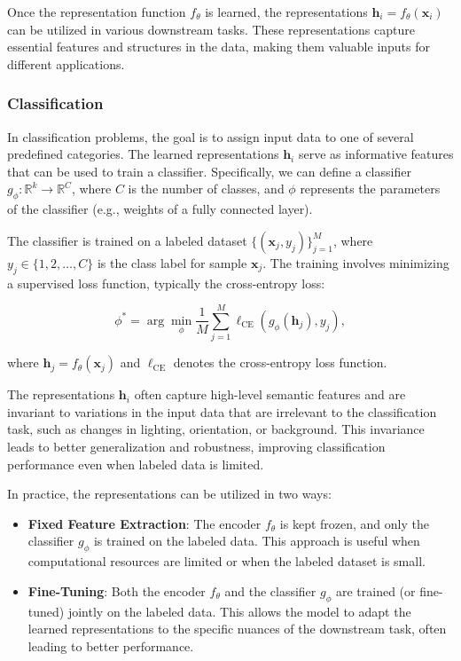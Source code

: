 \begin{itemize}
Once the representation function \( f_{\theta} \) is learned, the representations \( \mathbf{h}_i = f_{\theta}(\mathbf{x}_i) \) can be utilized in various downstream tasks. These representations capture essential features and structures in the data, making them valuable inputs for different applications.

\subsubsection{Classification}

In classification problems, the goal is to assign input data to one of several predefined categories. The learned representations \( \mathbf{h}_i \) serve as informative features that can be used to train a classifier. Specifically, we can define a classifier \( g_{\phi} : \mathbb{R}^k \rightarrow \mathbb{R}^C \), where \( C \) is the number of classes, and \( \phi \) represents the parameters of the classifier (e.g., weights of a fully connected layer).

The classifier is trained on a labeled dataset \( \{ (\mathbf{x}_j, y_j) \}_{j=1}^M \), where \( y_j \in \{1, 2, \dots, C\} \) is the class label for sample \( \mathbf{x}_j \). The training involves minimizing a supervised loss function, typically the cross-entropy loss:

\[
\phi^* = \arg \min_{\phi} \frac{1}{M} \sum_{j=1}^M \ell_{\text{CE}}(g_{\phi}(\mathbf{h}_j), y_j),
\]

where \( \mathbf{h}_j = f_{\theta}(\mathbf{x}_j) \) and \( \ell_{\text{CE}} \) denotes the cross-entropy loss function.

The representations \( \mathbf{h}_i \) often capture high-level semantic features and are invariant to variations in the input data that are irrelevant to the classification task, such as changes in lighting, orientation, or background. This invariance leads to better generalization and robustness, improving classification performance even when labeled data is limited.

In practice, the representations can be utilized in two ways:

\begin{itemize}
    \item \textbf{Fixed Feature Extraction}: The encoder \( f_{\theta} \) is kept frozen, and only the classifier \( g_{\phi} \) is trained on the labeled data. This approach is useful when computational resources are limited or when the labeled dataset is small.
    \item \textbf{Fine-Tuning}: Both the encoder \( f_{\theta} \) and the classifier \( g_{\phi} \) are trained (or fine-tuned) jointly on the labeled data. This allows the model to adapt the learned representations to the specific nuances of the downstream task, often leading to better performance.
\end{itemize}


\end{itemize}
